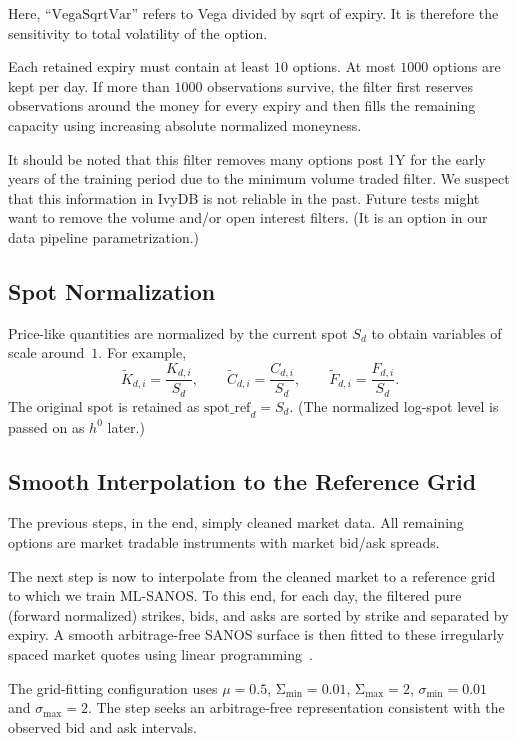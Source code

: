 \documentclass[11pt,a4paper]{article}
\begin{document}
Here, ``$\mathrm{VegaSqrtVar}$'' refers to Vega divided by sqrt of expiry. It is therefore
the sensitivity to total volatility of the option.

Each retained expiry must contain at least \(10\) options. At most \(1000\) options are kept per day. If more than \(1000\) observations survive, the filter first reserves observations around the money for every expiry and then fills the remaining capacity using increasing absolute normalized moneyness.

It should be noted that this filter removes many options post 1Y for the early years of the training period due to the minimum volume
traded filter. We suspect that this information in IvyDB is not reliable in the past.
Future tests might want to remove the volume and/or open interest filters. (It is an option
in our data pipeline parametrization.)

\subsection{Spot Normalization}

Price-like quantities are normalized by the current spot \(S_d\) to obtain
variables of scale around~$1$. For example,
%
\[
    \widetilde{K}_{d,i}
    =
    \frac{K_{d,i}}{S_d},
    \qquad
    \widetilde{C}_{d,i}
    =
    \frac{C_{d,i}}{S_d},
    \qquad
    \widetilde{F}_{d,i}
    =
    \frac{F_{d,i}}{S_d}.
\]
The original spot is retained as
$
    \mathrm{spot\_ref}_d = S_d.
$
(The normalized log-spot level is passed on as $h^0$ later.)

\subsection{Smooth Interpolation to the Reference Grid}

The previous steps, in the end, simply cleaned market data. All remaining options are market
tradable instruments with market bid/ask spreads.

The next step is now to interpolate from the cleaned market to a reference grid to which 
we train ML-SANOS. To this end, for each day, the filtered pure (forward normalized) strikes, bids, and asks are sorted by strike and separated by expiry. A smooth arbitrage-free SANOS surface is then fitted to these irregularly spaced market quotes using linear programming~\cite{SANOS2026}.

The grid-fitting configuration uses
$
    \mu=0.5
$, $\mathrm{\Sigma}_{\min}=0.01$,
$\mathrm{\Sigma}_{\max}=2$, $\sigma_{\min}=0.01$ and $\sigma_{\max}=2$.
The step seeks an arbitrage-free representation consistent with the observed bid and ask intervals. 
\end{document}

